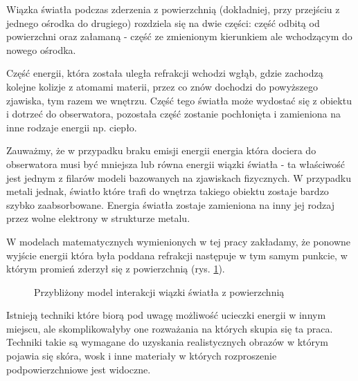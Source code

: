\documentclass[../main.tex]{subfiles}
\begin{document}
Wiązka światła podczas zderzenia z powierzchnią (dokładniej, przy przejściu z
jednego ośrodka do drugiego) rozdziela się na dwie części: część odbitą od
powierzchni oraz załamaną - część ze zmienionym kierunkiem ale wchodzącym do
nowego ośrodka.

Część energii, która została uległa refrakcji wchodzi wgłąb, gdzie
zachodzą kolejne kolizje z atomami materii, przez co znów dochodzi do
powyższego zjawiska, tym razem we wnętrzu. Część tego światła może
wydostać się z obiektu i dotrzeć do obserwatora, pozostała część zostanie
pochłonięta i zamieniona na inne rodzaje energii np. ciepło.

Zauważmy, że w przypadku braku emisji energii energia która dociera do
obserwatora musi być mniejsza lub równa energii wiązki światła - ta właściwość
jest jednym z filarów modeli bazowanych na zjawiskach fizycznych. W przypadku
metali jednak, światło które trafi do wnętrza takiego obiektu zostaje bardzo
szybko zaabsorbowane. Energia światła zostaje zamieniona na inny jej rodzaj
przez wolne elektrony w strukturze metalu.

W modelach matematycznych wymienionych w tej pracy zakładamy, że ponowne
wyjście energii która była poddana refrakcji następuje w tym samym punkcie, w
którym promień zderzył się z powierzchnią (rys. \ref{fig:ReflectionRefraction}).

\begin{figure}[h]
  \centering
  \caption{Przybliżony model interakcji wiązki światła z powierzchnią}
  \label{fig:ReflectionRefraction}
\end{figure}

Istnieją techniki które biorą pod uwagę możliwość ucieczki energii w innym
miejscu, ale skomplikowałyby one rozważania na których skupia się ta praca.
Techniki takie są wymagane do uzyskania realistycznych obrazów w którym pojawia
się skóra, wosk i inne materiały w których rozproszenie podpowierzchniowe
jest widoczne.
\end{document}
